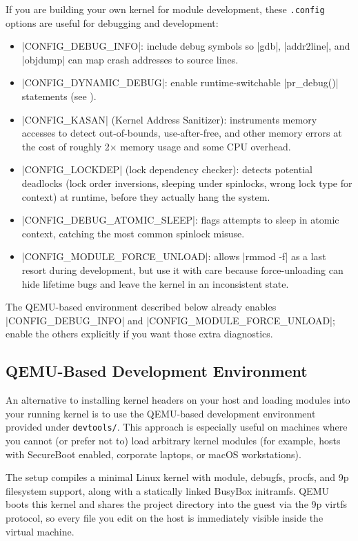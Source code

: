 \documentclass[10pt, oneside]{book}
\begin{document}
If you are building your own kernel for module development, these \verb|.config| options are useful for debugging and development:
\begin{itemize}
  \item \cpp|CONFIG_DEBUG_INFO|: include debug symbols so \sh|gdb|, \sh|addr2line|, and \sh|objdump| can map crash addresses to source lines.
  \item \cpp|CONFIG_DYNAMIC_DEBUG|: enable runtime-switchable \cpp|pr_debug()| statements (see ).
  \item \cpp|CONFIG_KASAN| (Kernel Address Sanitizer): instruments memory accesses to detect out-of-bounds, use-after-free, and other memory errors at the cost of roughly 2$\times$ memory usage and some CPU overhead.
  \item \cpp|CONFIG_LOCKDEP| (lock dependency checker): detects potential deadlocks (lock order inversions, sleeping under spinlocks, wrong lock type for context) at runtime, before they actually hang the system.
  \item \cpp|CONFIG_DEBUG_ATOMIC_SLEEP|: flags attempts to sleep in atomic context, catching the most common spinlock misuse.
  \item \cpp|CONFIG_MODULE_FORCE_UNLOAD|: allows \sh|rmmod -f| as a last resort during development, but use it with care because force-unloading can hide lifetime bugs and leave the kernel in an inconsistent state.
\end{itemize}
The QEMU-based environment described below already enables
\cpp|CONFIG_DEBUG_INFO| and \cpp|CONFIG_MODULE_FORCE_UNLOAD|; enable the
others explicitly if you want those extra diagnostics.

\subsection{QEMU-Based Development Environment}
\label{sec:devtools_setup}
An alternative to installing kernel headers on your host and loading modules
into your running kernel is to use the QEMU-based development environment
provided under \verb|devtools/|.
This approach is especially useful on machines where you cannot (or prefer not to)
load arbitrary kernel modules (for example, hosts with SecureBoot enabled, corporate
laptops, or macOS workstations).

The setup compiles a minimal Linux kernel with module, debugfs, procfs, and 9p
filesystem support, along with a statically linked BusyBox initramfs.
QEMU boots this kernel and shares the project directory into the guest via the 9p
virtfs protocol, so every file you edit on the host is immediately visible inside the
virtual machine.
\end{document}
